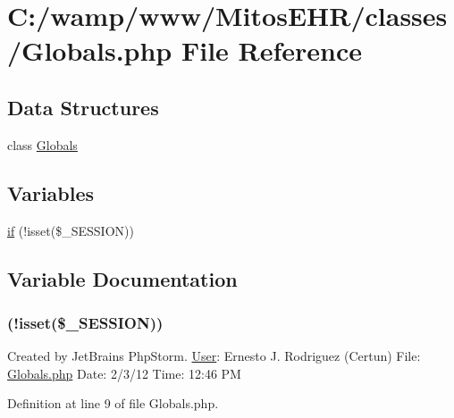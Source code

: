 \hypertarget{_globals_8php}{\section{\-C\-:/wamp/www/\-Mitos\-E\-H\-R/classes/\-Globals.php \-File \-Reference}
\label{_globals_8php}
}
\subsection*{\-Data \-Structures}
\begin{DoxyCompactItemize}
\item 
class \hyperlink{class_globals}{\-Globals}
\end{DoxyCompactItemize}
\subsection*{\-Variables}
\begin{DoxyCompactItemize}
\item 
\hyperlink{_globals_8php_a8ceca98aa29914fd2479a84a8d2242fb}{if} (!isset(\$\-\_\-\-S\-E\-S\-S\-I\-O\-N))
\end{DoxyCompactItemize}


\subsection{\-Variable \-Documentation}
\hypertarget{_globals_8php_a8ceca98aa29914fd2479a84a8d2242fb}{
\subsubsection[{if}]{(!isset(\$\-\_\-\-S\-E\-S\-S\-I\-O\-N))}}\label{_globals_8php_a8ceca98aa29914fd2479a84a8d2242fb}
\-Created by \-Jet\-Brains \-Php\-Storm. \hyperlink{class_user}{\-User}\-: \-Ernesto \-J. \-Rodriguez (\-Certun) \-File\-: \hyperlink{_globals_8php}{\-Globals.\-php} \-Date\-: 2/3/12 \-Time\-: 12\-:46 \-P\-M 

\-Definition at line 9 of file \-Globals.\-php.

